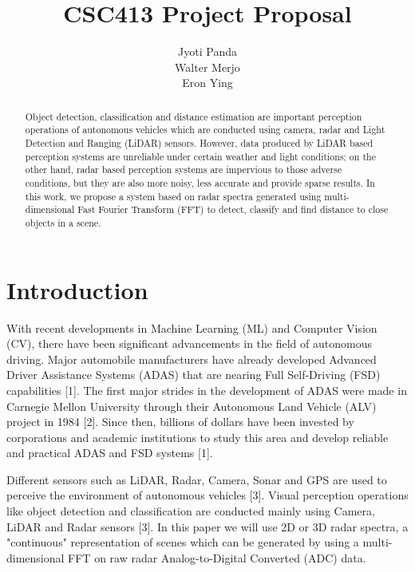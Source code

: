 \documentclass{article}
\title{CSC413 Project Proposal}
\author{%
  Jyoti Panda\\
  \And
  Walter Merjo\\
  \And
  Eron Ying
}
\begin{document}
\maketitle

\begin{abstract}
Object detection, classification and distance estimation are important perception operations of autonomous vehicles which are conducted using camera, radar and Light Detection and Ranging (LiDAR) sensors. However, data produced by LiDAR based perception systems are unreliable under certain weather and light conditions; on the other hand, radar based perception systems are impervious to those adverse conditions, but they are also more noisy, less accurate and provide sparse results. In this work, we propose a system based on radar spectra generated using multi-dimensional Fast Fourier Transform (FFT) to detect, classify and find distance to close objects in a scene. 
\end{abstract}

\section{Introduction}
With recent developments in Machine Learning (ML) and Computer Vision (CV), there have been significant advancements in the field of autonomous driving. Major automobile manufacturers have already developed Advanced Driver Assistance Systems (ADAS) that are nearing Full Self-Driving (FSD) capabilities [1]. The first major strides in the development of ADAS were made in Carnegie Mellon University through their Autonomous Land Vehicle (ALV) project in 1984 [2]. Since then, billions of dollars have been invested by corporations and academic institutions to study this area and develop reliable and practical ADAS and FSD systems [1].

Different sensors such as LiDAR, Radar, Camera, Sonar and GPS are used to perceive the environment of autonomous vehicles [3]. Visual perception operations like object detection and classification are conducted mainly using Camera, LiDAR and Radar sensors [3]. In this paper we will use 2D or 3D radar spectra, a "continuous" representation of scenes which can be generated by using a multi-dimensional FFT on raw radar Analog-to-Digital Converted (ADC) data.
\end{document}
